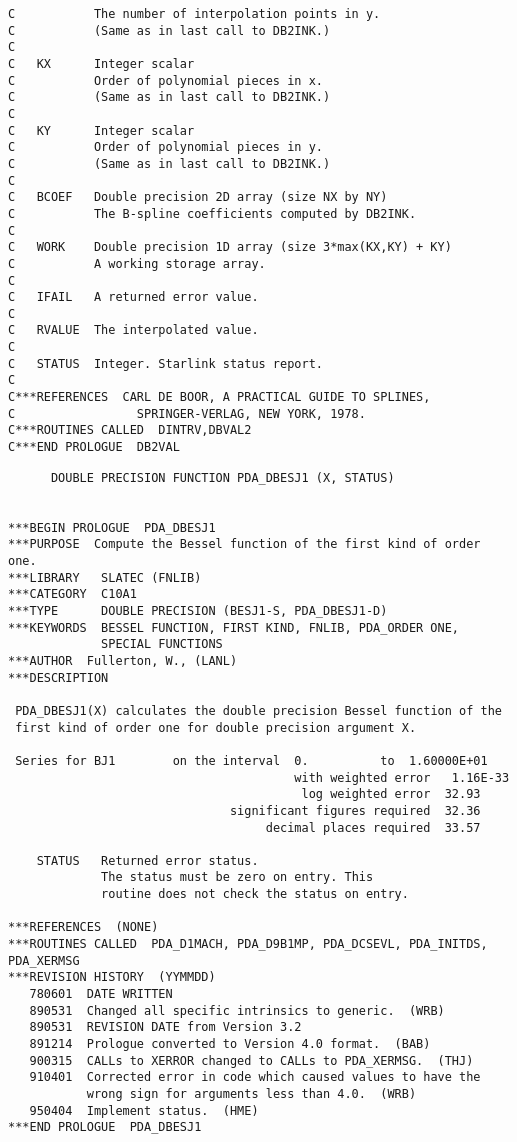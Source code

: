 \begin{verbatim}
C           The number of interpolation points in y.
C           (Same as in last call to DB2INK.)
C
C   KX      Integer scalar
C           Order of polynomial pieces in x.
C           (Same as in last call to DB2INK.)
C
C   KY      Integer scalar
C           Order of polynomial pieces in y.
C           (Same as in last call to DB2INK.)
C
C   BCOEF   Double precision 2D array (size NX by NY)
C           The B-spline coefficients computed by DB2INK.
C
C   WORK    Double precision 1D array (size 3*max(KX,KY) + KY)
C           A working storage array.
C
C   IFAIL   A returned error value.
C   
C   RVALUE  The interpolated value.
C
C   STATUS  Integer. Starlink status report.
C
C***REFERENCES  CARL DE BOOR, A PRACTICAL GUIDE TO SPLINES,
C                 SPRINGER-VERLAG, NEW YORK, 1978.
C***ROUTINES CALLED  DINTRV,DBVAL2
C***END PROLOGUE  DB2VAL
\end{verbatim}

 

\begin{verbatim}
      DOUBLE PRECISION FUNCTION PDA_DBESJ1 (X, STATUS)


***BEGIN PROLOGUE  PDA_DBESJ1
***PURPOSE  Compute the Bessel function of the first kind of order one.
***LIBRARY   SLATEC (FNLIB)
***CATEGORY  C10A1
***TYPE      DOUBLE PRECISION (BESJ1-S, PDA_DBESJ1-D)
***KEYWORDS  BESSEL FUNCTION, FIRST KIND, FNLIB, PDA_ORDER ONE,
             SPECIAL FUNCTIONS
***AUTHOR  Fullerton, W., (LANL)
***DESCRIPTION

 PDA_DBESJ1(X) calculates the double precision Bessel function of the
 first kind of order one for double precision argument X.

 Series for BJ1        on the interval  0.          to  1.60000E+01
                                        with weighted error   1.16E-33
                                         log weighted error  32.93
                               significant figures required  32.36
                                    decimal places required  33.57

    STATUS   Returned error status.
             The status must be zero on entry. This
             routine does not check the status on entry.

***REFERENCES  (NONE)
***ROUTINES CALLED  PDA_D1MACH, PDA_D9B1MP, PDA_DCSEVL, PDA_INITDS, PDA_XERMSG
***REVISION HISTORY  (YYMMDD)
   780601  DATE WRITTEN
   890531  Changed all specific intrinsics to generic.  (WRB)
   890531  REVISION DATE from Version 3.2
   891214  Prologue converted to Version 4.0 format.  (BAB)
   900315  CALLs to XERROR changed to CALLs to PDA_XERMSG.  (THJ)
   910401  Corrected error in code which caused values to have the
           wrong sign for arguments less than 4.0.  (WRB)
   950404  Implement status.  (HME)
***END PROLOGUE  PDA_DBESJ1
\end{verbatim}

